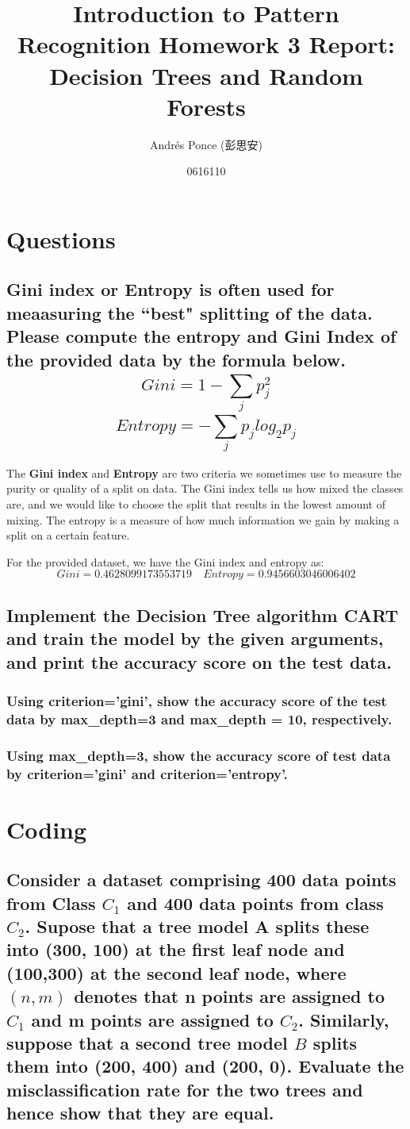 \documentclass{article}
\title{Introduction to Pattern Recognition Homework 3 Report:
Decision Trees and Random Forests}
\author{Andr\'es Ponce (彭思安)\\
\and
0616110}
\begin{document}
\maketitle


\section{Questions}
	\subsection{Gini index or Entropy is often used for meaasuring the ``best" splitting of the 
		data. Please compute the entropy and Gini Index of the provided data by the formula below.
			\[ Gini = 1 - \sum_{j}^{}p^{2}_{j}\]
			\[ Entropy = -\sum_{j}^{}p_{j}log_{2}p_{j}\]
		}
	The \textbf{Gini index} and \textbf{Entropy} are two criteria we sometimes use to measure the 
	purity or quality of a split on data. The Gini index tells us how mixed the classes are, and 
	we would like to choose the split that results in the lowest amount of mixing. The entropy is
	a measure of how much information we gain by making a split on a certain feature.

	For the provided dataset, we have the Gini index and entropy as:
	\[ Gini = 0.4628099173553719 \quad Entropy = 0.9456603046006402\]

	\subsection{Implement the Decision Tree algorithm CART and train the model by the given arguments,
				and print the accuracy score on the test data.}

		\subsubsection{Using criterion='gini', show the accuracy score of the test data by 
				max\_depth=3 and max\_depth = 10, respectively.}

		\subsubsection{Using max\_depth=3, show the accuracy score of test data by criterion='gini' 
						and criterion='entropy'.}
\section{Coding}
	\subsection{Consider a dataset comprising 400 data points from Class $C_{1}$ and 400 data points 
		from class $C_{2}$. Supose that a tree model A splits these into (300, 100) at the first leaf
		node and (100,300) at the second leaf node, where $(n,m)$ denotes that n points are assigned 
		to $C_{1}$ and m points are assigned to $C_{2}$. Similarly, suppose that a second tree model $B$
		splits them into (200, 400) and (200, 0). Evaluate the misclassification rate for the two trees
		and hence show that they are equal.}
		
\end{document}
